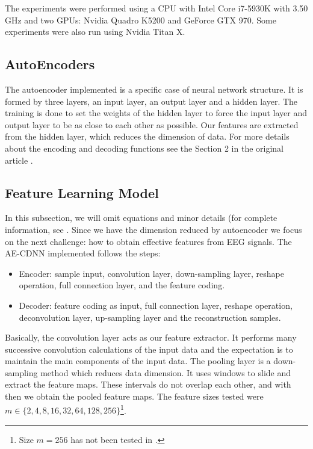 The experiments were performed using a CPU with Intel Core i7-5930K with 3.50 GHz and two GPUs: Nvidia Quadro K5200 and GeForce GTX 970. Some experiments were also run using Nvidia Titan X.

\subsection{AutoEncoders}

The autoencoder implemented is a specific case of neural network structure. It is formed by three layers, an input layer, an output layer and a hidden layer. The training is done to set the weights of the hidden layer to force the input layer and output layer to be as close to each other as possible. Our features are extracted from the hidden layer, which reduces the dimension of data. For more details about the encoding and decoding functions see the Section 2 in the original article \cite{WenZha:2018}.

\subsection{Feature Learning Model}

In this subsection, we will omit equations and minor details (for complete information, see \cite{Shoeb,emami2019autoencoding}. Since we have the dimension reduced by autoencoder we focus on the next challenge: how to obtain effective features from EEG signals. The AE-CDNN implemented follows the steps:

\begin{itemize}
\item Encoder: sample input, convolution layer, down-sampling layer, reshape operation, full connection layer, and the feature coding.
\item Decoder: feature coding as input, full 
connection layer, reshape operation, deconvolution layer, up-sampling layer and the reconstruction samples.
\end{itemize}

Basically, the convolution layer acts as our feature extractor. It performs many successive convolution calculations of the input data and the expectation is to maintain the main components of the input data. The pooling layer is a down-sampling method which reduces data dimension. It uses windows to slide and extract the feature maps. These intervals do not overlap each other, and with then we obtain the pooled feature maps. The feature sizes tested were $m \in \{2, 4, 8, 16, 32, 64, 128, 256\}$\footnote{Size $m = 256$ has not been tested in \cite{WenZha:2018}.}.


